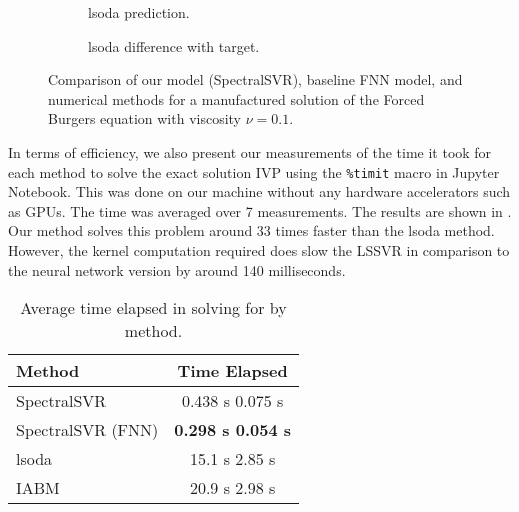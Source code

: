 \documentclass[preprint,12pt,times,authoryear]{elsarticle}
\begin{document}
\begin{figure}[hbp]
\begin{adjustwidth}{-0.05\linewidth}{-0.05\linewidth}
\begin{subfigure}{0.49\linewidth}
      \begin{adjustbox}{width=\linewidth}
        
      \end{adjustbox}
      \caption{lsoda prediction.}\label{fig:comp_spo_pred_0.1}
    \end{subfigure}
    \begin{subfigure}{0.49\linewidth}
      \begin{adjustbox}{width=\linewidth}
        
      \end{adjustbox}
      \caption{lsoda difference with target.}\label{fig:comp_spo_diff_0.1}
    \end{subfigure}
  \end{adjustwidth}
  \caption{Comparison of our model (SpectralSVR), baseline FNN model, and numerical methods for a manufactured solution of the Forced Burgers equation with viscosity \(\nu=0.1\).}\label{fig:comparison_burgers_0.1}
\end{figure}

In terms of efficiency, we also present our measurements of the time it took for each method to solve the exact solution IVP using the \verb|%timit| macro in Jupyter Notebook. This was done on our machine without any hardware accelerators such as GPUs. The time was averaged over 7 measurements. The results are shown in . Our method solves this problem around 33 times faster than the lsoda method. However, the kernel computation required does slow the LSSVR in comparison to the neural network version by around 140 milliseconds.
\begin{table}[hbp]
  \caption{Average time elapsed in solving for  by method.}\label{table:comparison_efficiency}
  \centering
  \begin{tabular}{lc}
    \toprule
    Method            & Time Elapsed                   \\
    \midrule
    SpectralSVR       & 0.438 s \pm{} 0.075 s          \\
    SpectralSVR (FNN) & \textbf{0.298 s \pm{} 0.054 s} \\
    lsoda             & 15.1 s \pm{} 2.85 s            \\
    IABM              & 20.9 s \pm{} 2.98 s            \\
    \bottomrule
  \end{tabular}
\end{table}
\end{document}
